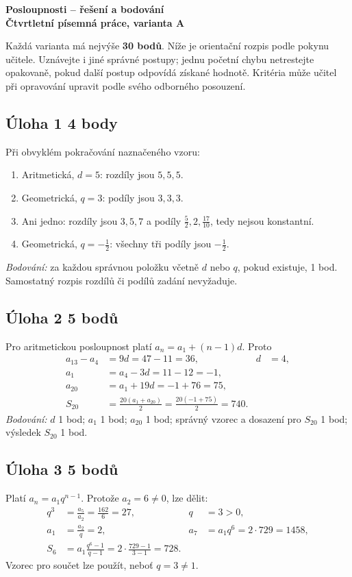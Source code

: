\documentclass[a4paper,11pt]{article}
\begin{document}
\begin{center}
    {\Large\bfseries Posloupnosti -- řešení a bodování}\\[2mm]
    {\bfseries Čtvrtletní písemná práce, varianta A}
\end{center}

Každá varianta má nejvýše \textbf{30 bodů}. Níže je orientační rozpis
podle pokynu učitele. Uznávejte i jiné správné postupy; jednu početní chybu
netrestejte opakovaně, pokud další postup odpovídá získané hodnotě.
Kritéria může učitel při opravování upravit podle svého odborného posouzení.

\subsection*{Úloha 1 \hfill 4 body}
Při obvyklém pokračování naznačeného vzoru:
\begin{enumerate}[label=\alph*)]
    \item Aritmetická, $d=5$: rozdíly jsou $5,5,5$.
    \item Geometrická, $q=3$: podíly jsou $3,3,3$.
    \item Ani jedno: rozdíly jsou $3,5,7$ a podíly
    $\frac52,2,\frac{17}{10}$, tedy nejsou konstantní.
    \item Geometrická, $q=-\frac12$: všechny tři podíly jsou $-\frac12$.
\end{enumerate}
\textit{Bodování:} za každou správnou položku včetně $d$ nebo $q$, pokud
existuje, 1 bod. Samostatný rozpis rozdílů či podílů zadání nevyžaduje.

\subsection*{Úloha 2 \hfill 5 bodů}
Pro aritmetickou posloupnost platí $a_n=a_1+(n-1)d$. Proto
\begin{align*}
    a_{13}-a_4&=9d=47-11=36, & d&=4,\\
    a_1&=a_4-3d=11-12=-1,\\
    a_{20}&=a_1+19d=-1+76=75,\\
    S_{20}&=\frac{20(a_1+a_{20})}{2}
    =\frac{20(-1+75)}2=740.
\end{align*}
\textit{Bodování:} $d$ 1 bod; $a_1$ 1 bod; $a_{20}$ 1 bod;
správný vzorec a dosazení pro $S_{20}$ 1 bod; výsledek $S_{20}$ 1 bod.

\subsection*{Úloha 3 \hfill 5 bodů}
Platí $a_n=a_1q^{n-1}$. Protože $a_2=6\ne0$, lze dělit:
\begin{align*}
    q^3&=\frac{a_5}{a_2}=\frac{162}{6}=27, & q&=3>0,\\
    a_1&=\frac{a_2}{q}=2, & a_7&=a_1q^6=2\cdot729=1458,\\
    S_6&=a_1\frac{q^6-1}{q-1}
    =2\cdot\frac{729-1}{3-1}=728.
\end{align*}
Vzorec pro součet lze použít, neboť $q=3\ne1$.
\end{document}
